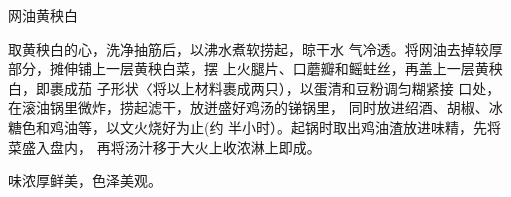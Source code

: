 \begin{recipe}{网油黄秧白}

\ingredients






\cooking

取黄秧白的心，洗净抽筋后，以沸水煮软捞起，晾干水 气冷透。将网油去掉较厚部分，摊伸铺上一层黄秧白菜，摆 上火腿片、口蘑瓣和鳐蛀丝，再盖上一层黄秧白，即裹成茄 子形状〈将以上材料裹成两只），以蛋清和豆粉调匀糊紧接 口处，在滚油锅里微炸，捞起滤干，放迸盛好鸡汤的锑锅里， 同时放进绍酒、胡椒、冰糖色和鸡油等，以文火烧好为止(约 半小时）。起锅时取出鸡油渣放进味精，先将菜盛入盘内， 再将汤汁移于大火上收浓淋上即成。

\notes

味浓厚鲜美，色泽美观。

\end{recipe}

